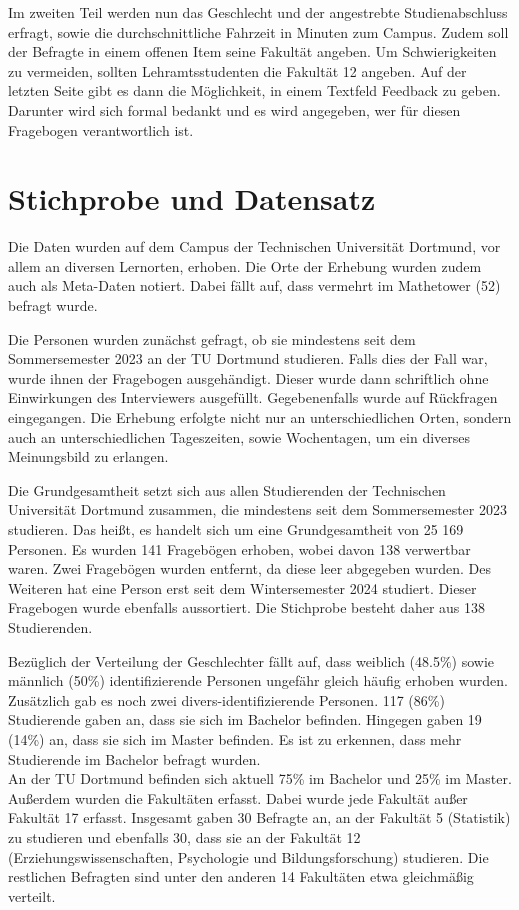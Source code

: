 \documentclass[11pt, a4paper]{article}
\begin{document}
Im zweiten Teil werden nun das Geschlecht und der angestrebte Studienabschluss erfragt, sowie die durchschnittliche Fahrzeit in Minuten zum Campus.
Zudem soll der Befragte in einem offenen Item seine Fakultät angeben.
Um Schwierigkeiten zu vermeiden, sollten Lehramtsstudenten die Fakultät 12 angeben.
Auf der letzten Seite gibt es dann die Möglichkeit, in einem Textfeld Feedback zu geben.
Darunter wird sich formal bedankt und es wird angegeben, wer für diesen Fragebogen verantwortlich ist.
\newpage
\section{Stichprobe und Datensatz}
\label{Stichprobe und Datensatz}

Die Daten wurden auf dem Campus der Technischen Universität Dortmund, vor allem an diversen Lernorten, erhoben. Die Orte der Erhebung wurden zudem auch als Meta-Daten notiert. Dabei fällt auf, dass vermehrt im Mathetower (52) befragt wurde.

Die Personen wurden zunächst gefragt, ob sie mindestens seit dem Sommersemester 2023 an der TU Dortmund studieren. Falls dies der Fall war, wurde ihnen der Fragebogen ausgehändigt. Dieser wurde dann schriftlich ohne Einwirkungen des Interviewers ausgefüllt. Gegebenenfalls wurde auf Rückfragen eingegangen.
Die Erhebung erfolgte nicht nur an unterschiedlichen Orten, sondern auch an unterschiedlichen Tageszeiten, sowie Wochentagen, um ein diverses Meinungsbild zu erlangen.

Die Grundgesamtheit setzt sich aus allen Studierenden der Technischen Universität Dortmund zusammen, die mindestens seit dem Sommersemester 2023 studieren. Das heißt, es handelt sich um eine Grundgesamtheit von 25 169 Personen. 
Es wurden 141 Fragebögen erhoben, wobei davon 138 verwertbar waren. Zwei Fragebögen wurden entfernt, da diese leer abgegeben wurden. Des Weiteren hat eine Person erst seit dem Wintersemester 2024 studiert. Dieser Fragebogen wurde ebenfalls aussortiert.
Die Stichprobe besteht daher aus 138 Studierenden.

Bezüglich der Verteilung der Geschlechter fällt auf, dass weiblich (48.5\%) sowie männlich (50\%) identifizierende Personen ungefähr gleich häufig erhoben wurden. Zusätzlich gab es noch zwei divers-identifizierende Personen. 
117 (86\%) Studierende gaben an, dass sie sich im Bachelor befinden. Hingegen gaben        19 (14\%) an, dass sie sich im Master befinden. Es ist zu erkennen, dass mehr Studierende im Bachelor befragt wurden. \\
An der TU Dortmund befinden sich aktuell 75\% im Bachelor und 25\% im Master.\\
Außerdem wurden die Fakultäten erfasst. Dabei wurde jede Fakultät außer Fakultät 17 erfasst. Insgesamt gaben 30 Befragte an, an der Fakultät 5 (Statistik) zu studieren und ebenfalls 30, dass sie an der Fakultät 12 (Erziehungswissenschaften, Psychologie und Bildungsforschung) studieren. Die restlichen Befragten sind unter den anderen 14 Fakultäten etwa gleichmäßig verteilt.\\
\end{document}
